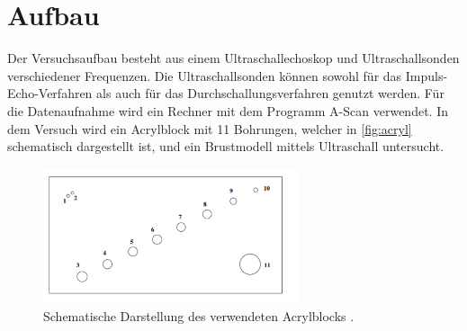 \section{Aufbau}
\label{sec:Aufbau}

Der Versuchsaufbau besteht aus einem Ultraschallechoskop und Ultraschallsonden verschiedener Frequenzen. 
Die Ultraschallsonden können sowohl für das Impuls-Echo-Verfahren als auch für das Durchschallungsverfahren genutzt werden.
Für die Datenaufnahme wird ein Rechner mit dem Programm A-Scan verwendet. In dem Versuch wird ein 
Acrylblock mit 11 Bohrungen, welcher in \autoref{fig:acryl} schematisch dargestellt ist, und ein Brustmodell 
mittels Ultraschall untersucht.

\begin{figure}
    \centering
    \includegraphics[height = 4cm]{block.pdf}
    \caption{Schematische Darstellung des verwendeten Acrylblocks \cite{apus1}.}
    \label{fig:acryl}
\end{figure}